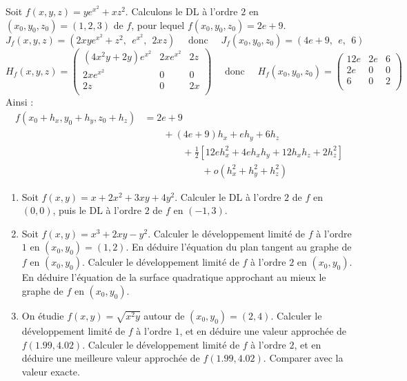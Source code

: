 \documentclass[11pt, class=report,crop=false]{standalone}
\begin{document}
\begin{exemple}
Soit $f(x,y,z) = ye^{x^2} + xz^2$. Calculons le DL à l'ordre $2$ en $(x_0,y_0,z_0) = (1,2,3)$ de $f$, pour lequel $f(x_0,y_0,z_0) = 2e + 9$.
$$J_f (x,y,z) = \left(2xye^{x^2} + z^2,\ \  e^{x^2},\ \  2xz \right)
\quad \text{ donc } \quad
J_f (x_0,y_0,z_0) = \left(4e + 9,\ \  e,\ \ 6 \right)$$
$$H_f(x,y,z)=
\begin{pmatrix}
(4x^2y+2y) e^{x^2} & 2xe^{x^2} & 2z \\
2xe^{x^2} &  0 & 0\\
2z &  0 & 2x \\
\end{pmatrix}
\quad \text{ donc } \quad
H_f(x_0,y_0,z_0)=
\begin{pmatrix}
12e & 2e & 6 \\
2e &  0 & 0\\
6 &  0 & 2\\
\end{pmatrix}$$
Ainsi :
\begin{align*}
f(x_0+h_x,y_0+h_y,z_0+h_z) 
& =2e + 9 \\
& \qquad +  (4e+9)h_x +  eh_y + 6h_z \\
& \qquad\qquad + \frac{1}{2}\left[ 12e h_x^2 + 4eh_xh_y +12h_xh_z +2h_z^2 \right] \\
& \qquad\qquad\qquad + o(h_x^2+h_y^2+h_z^2)
\end{align*}

\end{exemple}
 

\begin{miniexercices}
\sauteligne
\begin{enumerate}
     \item Soit $f(x,y) = x + 2x^2 + 3xy + 4y^2$. Calculer le DL à l'ordre $2$ de $f$ en $(0,0)$, puis le DL à l'ordre $2$ de $f$ en $(-1,3)$.

    \item Soit $f(x,y) = x^3  +2xy - y^2$. Calculer le développement limité de $f$ à l'ordre $1$ en $(x_0,y_0)=(1,2)$. En déduire l'équation du plan tangent au graphe de $f$ en $(x_0,y_0)$. Calculer le développement limité de $f$ à l'ordre $2$ en $(x_0,y_0)$. En déduire l'équation de la surface quadratique approchant au mieux le graphe de $f$ en $(x_0,y_0)$. 

    \item On étudie $f(x,y) = \sqrt{x^2y}$ autour de $(x_0,y_0)= (2,4)$.
   Calculer le développement limité de $f$ à l'ordre $1$, et en déduire une valeur approchée de $f(1.99,4.02)$. Calculer le développement limité de $f$ à l'ordre $2$, et en déduire une meilleure valeur approchée de $f(1.99,4.02)$. Comparer avec la valeur exacte.
 
\end{enumerate}
\end{miniexercices}
\end{document}

